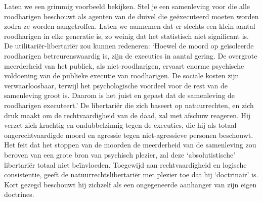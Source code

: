 \documentclass[
  a5paper,
  smalldemyvopaper,10pt,twoside,onecolumn,openright,extrafontsizes,hidelinks]{memoir}
\begin{document}
Laten we een grimmig voorbeeld bekijken. Stel je een samenleving voor
die alle roodharigen beschouwt als agenten van de duivel die
geëxecuteerd moeten worden zodra ze worden aangetroffen. Laten we
aannemen dat er slechts een klein aantal roodharigen in elke generatie
is, zo weinig dat het statistisch niet significant is. De
utilitariër-libertariër zou kunnen redeneren: `Hoewel de moord op
geïsoleerde roodharigen betreurenswaardig is, zijn de executies in
aantal gering. De overgrote meerderheid van het publiek, als
niet-roodharigen, ervaart enorme psychische voldoening van de publieke
executie van roodharigen. De sociale kosten zijn verwaarloosbaar,
terwijl het psychologische voordeel voor de rest van de samenleving
groot is. Daarom is het juist en gepast dat de samenleving de
roodharigen executeert.' De libertariër die zich baseert op
natuurrechten, en zich druk maakt om de rechtvaardigheid van de daad,
zal met afschuw reageren. Hij verzet zich krachtig en ondubbelzinnig
tegen de executies, die hij als totaal ongerechtvaardigde moord en
agressie tegen niet-agressieve personen beschouwt. Het feit dat het
stoppen van de moorden de meerderheid van de samenleving zou beroven van
een grote bron van psychisch plezier, zal deze `absolutistische'
libertariër totaal niet beïnvloeden. Toegewijd aan rechtvaardigheid en
logische consistentie, geeft de natuurrechtslibertariër met plezier toe
dat hij `doctrinair' is. Kort gezegd beschouwt hij zichzelf als een
ongegeneerde aanhanger van zijn eigen doctrines.
\end{document}

